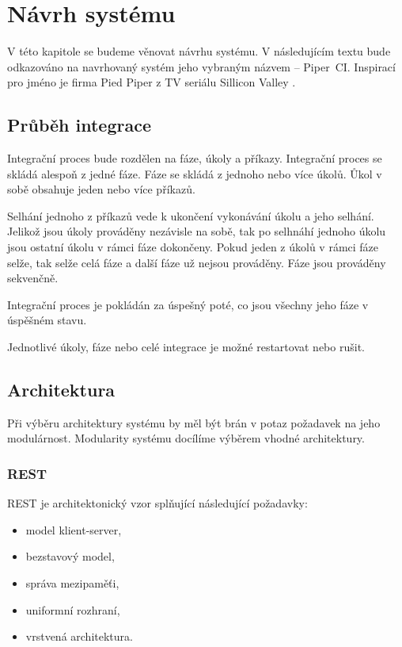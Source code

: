 \chapter{Návrh systému}

V této kapitole se budeme věnovat návrhu systému.
V následujícím textu bude odkazováno na navrhovaný systém jeho vybraným názvem -- Piper~CI.
Inspirací pro jméno je firma Pied Piper z TV seriálu Sillicon Valley \cite{pied_piper}.

\section{Průběh integrace}

Integrační proces bude rozdělen na fáze, úkoly a příkazy.
Integrační proces se skládá alespoň z jedné fáze.
Fáze se skládá z jednoho nebo více úkolů.
Ůkol v sobě obsahuje jeden nebo více příkazů.

Selhání jednoho z příkazů vede k ukončení vykonávání úkolu a jeho selhání.
Jelikož jsou úkoly prováděny nezávisle na sobě, tak po selhnáhí jednoho úkolu jsou ostatní úkolu v rámci fáze dokončeny.
Pokud jeden z úkolů v rámci fáze selže, tak selže celá fáze a další fáze už nejsou prováděny.
Fáze jsou prováděny sekvenčně.

Integrační proces je pokládán za úspešný poté, co jsou všechny jeho fáze v úspěšném stavu.

Jednotlivé úkoly, fáze nebo celé integrace je možné restartovat nebo rušit.

\section{Architektura}

Při výběru architektury systému by měl být brán v potaz požadavek na jeho modulárnost.
Modularity systému docílíme výběrem vhodné architektury.

\subsection{REST}

REST je architektonický vzor splňující následující požadavky:

\begin{itemize}
    \item model klient-server,
    \item bezstavový model,
    \item správa mezipaměťi,
    \item uniformní rozhraní,
    \item vrstvená architektura.
\end{itemize}

